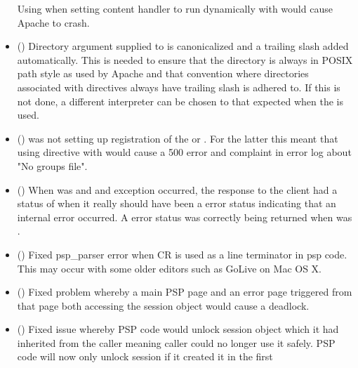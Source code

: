 \begin{itemize}
      Using  when setting content handler to
      run dynamically with  would cause Apache to
      crash.
     \item
      ()
      Directory argument supplied to  is
      canonicalized and a trailing slash added automatically. This is
      needed to ensure that the directory is always in POSIX path style as
      used by Apache and that convention where directories associated with
      directives always have trailing slash is adhered to. If this is not
      done, a different interpreter can be chosen to that expected when the
       is used.
    \item
      ()
       was not setting up registration of the
       or . For the
      latter this meant that using  directive with
       would cause a 500 error and complaint in
      error log about "No groups file".
    \item
      ()
      When  was  and and exception occurred, the
      response to the client had a status of  when it really should
      have been a  error status indicating that an internal error
      occurred. A  error status was correctly being returned when
       was .
    \item
      ()
      Fixed psp_parser error when CR is used as a line terminator in psp code.
      This may occur with some older editors such as GoLive on Mac OS X.
    \item
      ()
      Fixed problem whereby a main PSP page and an error page triggered from
      that page both accessing the session object would cause a deadlock.
    \item
      ()
      Fixed issue whereby PSP code would unlock session object which it had
      inherited from the caller meaning caller could no longer use it safely.
      PSP code will now only unlock session if it created it in the first

\end{itemize}
